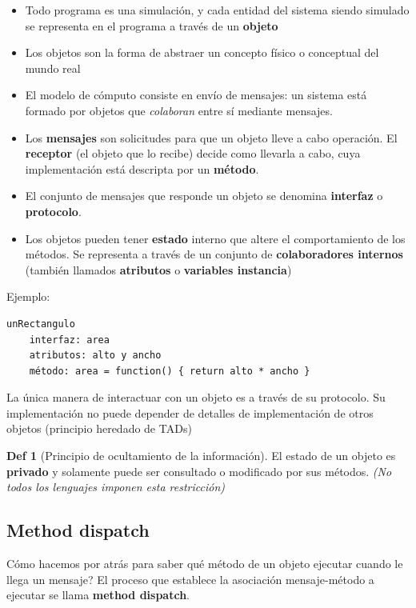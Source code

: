 \documentclass{report}
\theoremstyle{definition} %
\newtheorem*{definition*}{Def}
\begin{document}
\begin{itemize}
    \item Todo programa es una simulación, y cada entidad del sistema siendo
    simulado se representa en el programa a través de un \textbf{objeto}
    \item Los objetos son la forma de abstraer un concepto físico o conceptual
    del mundo real
    \item El modelo de cómputo consiste en envío de mensajes: un sistema está
    formado por objetos que \textit{colaboran} entre sí mediante mensajes.
    \item Los \textbf{mensajes} son solicitudes para que un objeto lleve a cabo
    operación. El \textbf{receptor} (el objeto que lo recibe) decide como
    llevarla a cabo, cuya implementación está descripta por un \textbf{método}.
    \item El conjunto de mensajes que responde un objeto se denomina
    \textbf{interfaz} o \textbf{protocolo}.
    \item Los objetos pueden tener \textbf{estado} interno que altere el
    comportamiento de los métodos. Se representa a través de un conjunto de
    \textbf{colaboradores internos} (también llamados \textbf{atributos} o
    \textbf{variables instancia})
\end{itemize}

Ejemplo:

\begin{verbatim}
unRectangulo
    interfaz: area
    atributos: alto y ancho
    método: area = function() { return alto * ancho }
\end{verbatim}

La única manera de interactuar con un objeto es a través de su protocolo. Su
implementación no puede depender de detalles de implementación de otros objetos
(principio heredado de TADs)

\begin{definition*}[Principio de ocultamiento de la información]
    El estado de un objeto es \textbf{privado} y solamente puede ser consultado
    o modificado por sus métodos. \textit{(No todos los lenguajes imponen esta
    restricción)}
\end{definition*}

\subsection{Method dispatch}

Cómo hacemos por atrás para saber qué método de un objeto ejecutar cuando le
llega un mensaje? El proceso que establece la asociación mensaje-método a
ejecutar se llama \textbf{method dispatch}.
\end{document}
